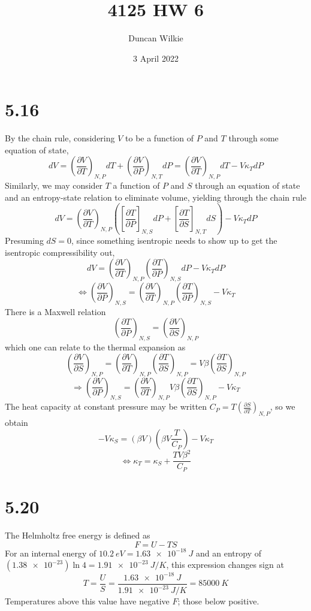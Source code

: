 \documentclass{article}
\title{4125 HW 6}
\author{Duncan Wilkie}
\date{3 April 2022}
\begin{document}
\maketitle

\section*{5.16}
By the chain rule, considering $V$ to be a function of $P$ and $T$ through some equation of state,
\[dV=\left( \frac{\partial V}{\partial T}\right)_{N,P}dT+\left( \frac{\partial V}{\partial P} \right)_{N,T}dP=\left( \frac{\partial V}{\partial T} \right)_{N,P}dT-V\kappa_{T}dP\]
Similarly, we may consider $T$ a function of $P$ and $S$ through an equation of state and an entropy-state relation to eliminate volume, yielding through the chain rule
\[dV=\left( \frac{\partial V}{\partial T} \right)_{N,P}\left(\left[ \frac{\partial T}{\partial P} \right]_{N,S}dP+\left[ \frac{\partial T}{\partial S}\right]_{N,T}dS  \right)-V\kappa_{T}dP\]
Presuming $dS=0$, since something isentropic needs to show up to get the isentropic compressibility out,
\[dV=\left( \frac{\partial V}{\partial T} \right)_{N,P}\left( \frac{\partial T}{\partial P} \right)_{N,S}dP-V\kappa_{T} dP\]
\[\Leftrightarrow \left( \frac{\partial V}{\partial P} \right)_{N,S}=\left( \frac{\partial V}{\partial T} \right)_{N,P}\left( \frac{\partial T}{\partial P} \right)_{N,S}-V\kappa_{T}\]
There is a Maxwell relation
\[\left( \frac{\partial T}{\partial P} \right)_{N,S}=\left( \frac{\partial V}{\partial S} \right)_{N,P}\]
which one can relate to the thermal expansion as
\[\left( \frac{\partial V}{\partial S} \right)_{N,P}=\left( \frac{\partial V}{\partial T} \right)_{N,P}\left( \frac{\partial T}{\partial S} \right)_{N,P}=V\beta\left( \frac{\partial T}{\partial S} \right)_{N,P}\]
\[\Rightarrow \left( \frac{\partial V}{\partial P} \right)_{N,S}=\left( \frac{\partial V}{\partial T} \right)_{N,P}V\beta\left( {\frac{\partial T}{\partial S}} \right)_{N,P}-V\kappa_{T}\]
The heat capacity at constant pressure may be written $C_{P}=T\left( \frac{\partial S}{\partial T} \right)_{N,P}$, so we obtain
\[-V\kappa_{S}=(\beta V)\left(\beta V\frac{T}{C_{P}}\right)-V\kappa_{T}\]
\[\Leftrightarrow \kappa_{T}=\kappa_{S}+\frac{TV\beta^{2}}{C_{P}}\]

\section*{5.20}
The Helmholtz free energy is defined as
\[F=U-TS\]
For an internal energy of $\SI{10.2}{eV}=\SI{1.63e-18}{J}$ and an entropy of $(\SI{1.38e-23})\ln 4=\SI{1.91e-23}{J/K}$, this expression changes sign at
\[T=\frac{U}{S}=\frac{\SI{1.63e-18}{J}}{\SI{1.91e-23}{J/K}}=\SI{85000}{K}\]
Temperatures above this value have negative $F$; those below positive.
\end{document}
